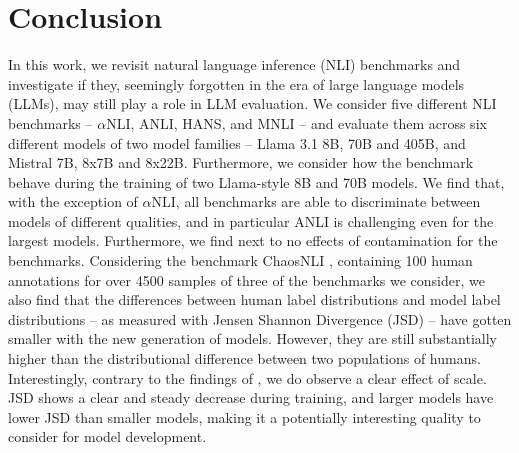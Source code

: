 \section{Conclusion}

In this work, we revisit natural language inference (NLI) benchmarks and investigate if they, seemingly forgotten in the era of large language models (LLMs), may still play a role in LLM evaluation.
We consider five different NLI benchmarks -- $\alpha$NLI, ANLI, HANS, and MNLI -- and evaluate them across six different models of two model families -- Llama 3.1 8B, 70B and 405B, and Mistral 7B, 8x7B and 8x22B.
Furthermore, we consider how the benchmark behave during the training of two Llama-style 8B and 70B models.
We find that, with the exception of $\alpha$NLI, all benchmarks are able to discriminate between models of different qualities, and in particular ANLI is challenging even for the largest models.
Furthermore, we find next to no effects of contamination for the benchmarks.
Considering the benchmark ChaosNLI \citep{nie-etal-2020-learn}, containing 100 human annotations for over 4500 samples of three of the benchmarks we consider, we also find that the differences between human label distributions and model label distributions -- as measured with Jensen Shannon Divergence (JSD) -- 
have gotten smaller with the new generation of models.
However, they are still substantially higher than the distributional difference between two populations of humans. %
Interestingly, contrary to the findings of \citet{nie-etal-2020-learn}, we do observe a clear effect of scale.
JSD shows a clear and steady decrease during training, and larger models have lower JSD than smaller models, making it a potentially interesting quality to consider for model development.

% 
